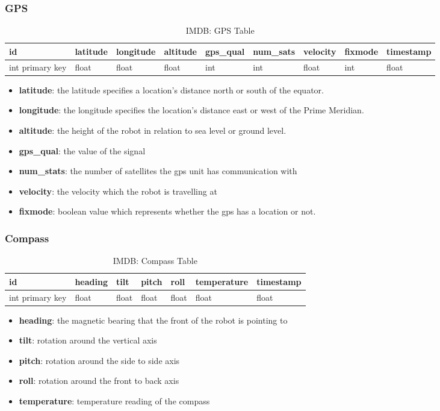 \subsubsection{GPS}
\begin{table}[!htb]
\centering
\begin{tabular}{|l|l|l|l|l|l|l|l|l|}
\hline
id              & latitude & longitude & altitude & gps\_qual & num\_sats & velocity & fixmode & timestamp \\ \hline
int primary key & float    & float     & float    & int       & int       & float    & int     & float\\ \hline
\end{tabular}
\caption{IMDB: GPS Table}
\label{tab:db-gps}
\end{table}
\begin{itemize}
\item{\textbf{latitude}}: the latitude specifies a location's distance north or south of the equator.
\item{\textbf{longitude}}: the longitude specifies the location's distance east or west of the Prime Meridian.
\item{\textbf{altitude}}: the height of the robot in relation to sea level or ground level.
\item{\textbf{gps\_qual}}: the value of the signal
\item{\textbf{num\_stats}}: the number of satellites the gps unit has communication with
\item{\textbf{velocity}}: the velocity which the robot is travelling at
\item{\textbf{fixmode}}: boolean value which represents whether the gps has a location or not.  
\end{itemize}


\subsubsection{Compass}
\begin{table}[!htb]
\centering
\begin{tabular}{|l|l|l|l|l|l|l|}
\hline
id              & heading & tilt  & pitch & roll  & temperature & timestamp \\ \hline
int primary key & float   & float & float & float & float       & float \\ \hline
\end{tabular}
\caption{IMDB: Compass Table}
\label{tab:db-compass}
\end{table}
\begin{itemize}
\item{\textbf{heading}}: the magnetic bearing that the front of the robot is pointing to
\item{\textbf{tilt}}: rotation around the vertical axis
\item{\textbf{pitch}}: rotation around the side to side axis
\item{\textbf{roll}}: rotation around the front to back axis
\item{\textbf{temperature}}: temperature reading of the compass
\end{itemize}


